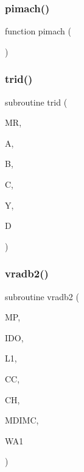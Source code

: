 \mbox{\label{sfft_8f_ad86cceddf7c0c034a76379b21163024e}} 
\subsubsection{\texorpdfstring{pimach()}{pimach()}}
{\footnotesize\ttfamily function pimach (\begin{DoxyParamCaption}{ }\end{DoxyParamCaption})}

\mbox{\label{sfft_8f_a4a0181d25fb290774bee46dec85265ff}} 
\subsubsection{\texorpdfstring{trid()}{trid()}}
{\footnotesize\ttfamily subroutine trid (\begin{DoxyParamCaption}\item[{}]{MR,  }\item[{dimension(1)}]{A,  }\item[{dimension(1)}]{B,  }\item[{dimension(1)}]{C,  }\item[{dimension(1)}]{Y,  }\item[{dimension(1)}]{D }\end{DoxyParamCaption})}

\mbox{\label{sfft_8f_a50cb81e98209534944c5c916df2eea93}} 
\subsubsection{\texorpdfstring{vradb2()}{vradb2()}}
{\footnotesize\ttfamily subroutine vradb2 (\begin{DoxyParamCaption}\item[{}]{MP,  }\item[{}]{I\+DO,  }\item[{}]{L1,  }\item[{dimension(mdimc,ido,2,l1)}]{CC,  }\item[{dimension(mdimc,ido,l1,2)}]{CH,  }\item[{}]{M\+D\+I\+MC,  }\item[{dimension(ido)}]{W\+A1 }\end{DoxyParamCaption})}

